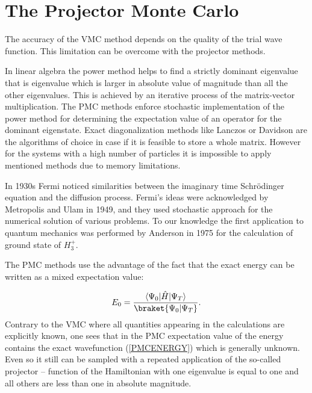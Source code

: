 \documentclass[twoside,english]{uiofysmaster}
\begin{document}
\section{The Projector Monte Carlo}\label{PMC}

The accuracy of the VMC method depends on the quality of the trial wave function. This limitation can be overcome with the projector methods.

 
In linear algebra the power method helps to find a strictly dominant eigenvalue that is eigenvalue which is larger in absolute value of magnitude than all the other eigenvalues. This is achieved by an iterative process of the matrix-vector multiplication\cite{LayLinearAlgebraIts2015}.
The PMC methods enforce stochastic implementation of the power method for determining the expectation value of an operator for the dominant eigenstate. Exact diagonalization methods like Lanczos or Davidson are the algorithms of choice in case if it is feasible to store a whole matrix. However for the systems with a high number of particles it is impossible to apply mentioned methods due to memory limitations. 

In 1930s Fermi noticed similarities between the imaginary time Schr\"{o}dinger equation and
the diffusion process. Fermi's ideas were acknowledged by Metropolis and Ulam in 1949, and they used stochastic approach for the numerical solution of various problems. To our knowledge the first application to quantum mechanics was performed by Anderson \cite{Andersonrandomwalksimulation1975} in 1975 for the calculation of ground state of $H_3^+$.


The PMC methods use the advantage of the fact that the exact energy can be written as a mixed expectation value:

\begin{equation}\label{PMCENERGY}
E_0 = \frac{\langle\Psi_0|\hat{H}|\Psi_T\rangle}{\braket{\Psi_0|\Psi_T}}.
\end{equation}
Contrary to the VMC where all quantities appearing in the calculations are explicitly known, one sees that in the PMC expectation value of the energy contains the exact wavefunction (\ref{PMCENERGY}) which is generally unknown. Even so it still can be sampled with a repeated application of the so-called projector -- function of the Hamiltonian with one eigenvalue is equal to one and all others are less than one in absolute magnitude.
\end{document}
